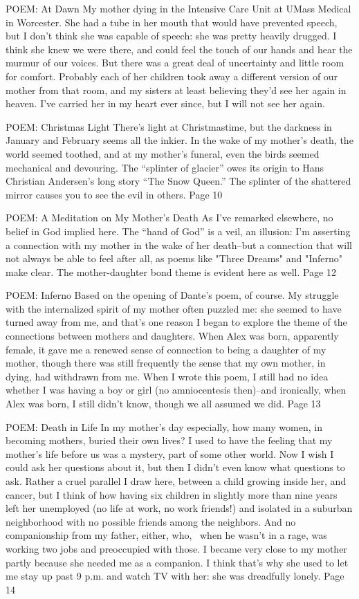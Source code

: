 POEM: At Dawn
My mother dying in the Intensive Care Unit at UMass Medical in Worcester. She had a tube in her mouth that would have prevented speech, but I don't think she was capable of speech: she was pretty heavily drugged. I think she knew we were there, and could feel the touch of our hands and hear the murmur of our voices. But there was a great deal of uncertainty and little room for comfort. Probably each of her children took away a different version of our mother from that room, and my sisters at least believing they'd see her again in heaven. I've carried her in my heart ever since, but I will not see her again. \pageref{chap:nxref:1}

POEM: Christmas Light
There's light at Christmastime, but the darkness in January and February seems all the inkier. In the wake of my mother's death, the world seemed toothed, and at my mother's funeral, even the birds seemed mechanical and devouring. The ``splinter of glacier'' owes its origin to Hans Christian Andersen's long story ``The Snow Queen.'' The splinter of the shattered mirror causes you to see the evil in others.
Page 10

POEM: A Meditation on My Mother's Death
As I've remarked elsewhere, no belief in God implied here. The ``hand of God'' is a veil, an illusion: I'm asserting a connection with my mother in the wake of her death--but a connection that will not always be able to feel after all, as poems like "Three Dreams" and "Inferno" make clear. The mother-daughter bond theme is evident here as well. Page 12

POEM: Inferno
Based on the opening of Dante's poem, of course. My struggle with the internalized spirit of my mother often puzzled me: she seemed to have turned away from me, and that's one reason I began to explore the theme of the connections between mothers and daughters. When Alex was born, apparently female, it gave me a renewed sense of connection to being a daughter of my mother, though there was still frequently the sense that my own mother, in dying, had withdrawn from me. When I wrote this poem, I still had no idea whether I was having a boy or girl (no amniocentesis then)--and ironically, when Alex was born, I still didn't know, though we all assumed we did. Page 13


POEM: Death in Life
In my mother's day especially, how many women, in becoming mothers, buried their own lives? I used to have the feeling that my mother's life before us was a mystery, part of some other world. Now I wish I could ask her questions about it, but then I didn't even know what questions to ask. Rather a cruel parallel I draw here, between a child growing inside her, and cancer, but I think of how having six children in slightly more than nine years left her unemployed (no life at work, no work friends!) and isolated in a suburban neighborhood with no possible friends among the neighbors. And no companionship from my father, either, who,  when he wasn't in a rage, was working two jobs and preoccupied with those. I became very close to my mother partly because she needed me as a companion. I think that's why she used to let me stay up past 9 p.m. and watch TV with her: she was dreadfully lonely. Page 14

